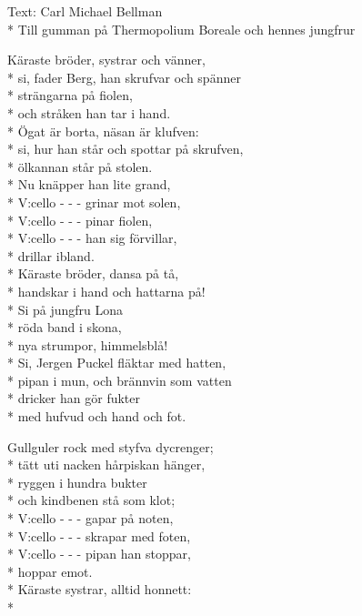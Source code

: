 \begin{SongText}
\begin{SongInfo}
    Text: Carl Michael Bellman\\*%
    Till gumman på Thermopolium Boreale och hennes jungfrur
\end{SongInfo}
\begin{SongVerse}
Käraste bröder, systrar och vänner,\\*%
si, fader Berg, han skrufvar och spänner\\*%
strängarna på fiolen,\\*%
och stråken han tar i hand.\\*%
Ögat är borta, näsan är klufven:\\*%
si, hur han står och spottar på skrufven,\\*%
ölkannan står på stolen.\\*%
Nu knäpper han lite grand,\\*%
V:cello - - - grinar mot solen,\\*%
V:cello - - - pinar fiolen,\\*%
V:cello - - - han sig förvillar,\\*%
drillar ibland.\\*%
Käraste bröder, dansa på tå,\\*%
handskar i hand och hattarna på!\\*%
Si på jungfru Lona\\*%
röda band i skona,\\*%
nya strumpor, himmelsblå!\\*%
Si, Jergen Puckel fläktar med hatten,\\*%
pipan i mun, och brännvin som vatten\\*%
dricker han gör fukter\\*%
med hufvud och hand och fot.
\end{SongVerse}
\begin{SongVerse}
Gullguler rock med styfva dycrenger;\\*%
tätt uti nacken hårpiskan hänger,\\*%
ryggen i hundra bukter\\*%
och kindbenen stå som klot;\\*%
V:cello - - - gapar på noten,\\*%
V:cello - - - skrapar med foten,\\*%
V:cello - - - pipan han stoppar,\\*%
hoppar emot.\\*%
Käraste systrar, alltid honnett:\\*%

\end{SongVerse}
\end{SongText}
